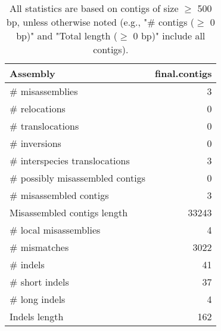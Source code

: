 \documentclass[12pt,a4paper]{article}
\begin{document}
\begin{table}[ht]
\begin{center}
\caption{All statistics are based on contigs of size $\geq$ 500 bp, unless otherwise noted (e.g., "\# contigs ($\geq$ 0 bp)" and "Total length ($\geq$ 0 bp)" include all contigs).}
\begin{tabular}{|l*{1}{|r}|}
\hline
Assembly & final.contigs \\ \hline
\# misassemblies & 3 \\ \hline
\hspace{5mm}\# relocations & 0 \\ \hline
\hspace{5mm}\# translocations & 0 \\ \hline
\hspace{5mm}\# inversions & 0 \\ \hline
\hspace{5mm}\# interspecies translocations & 3 \\ \hline
\# possibly misassembled contigs & 0 \\ \hline
\# misassembled contigs & 3 \\ \hline
Misassembled contigs length & 33243 \\ \hline
\# local misassemblies & 4 \\ \hline
\# mismatches & 3022 \\ \hline
\# indels & 41 \\ \hline
\hspace{5mm}\# short indels & 37 \\ \hline
\hspace{5mm}\# long indels & 4 \\ \hline
Indels length & 162 \\ \hline
\end{tabular}
\end{center}
\end{table}
\end{document}
